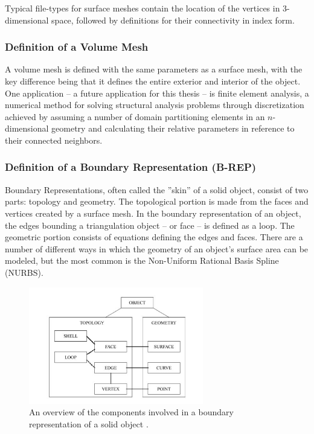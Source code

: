 \documentclass[12pt]{drexelthesis}
\let\Oldsubsubsection\subsubsection
\renewcommand{\subsubsection}{\FloatBarrier\Oldsubsubsection}
\begin{document}
Typical file-types for surface meshes contain the location of the vertices in 3-dimensional space, followed by definitions for their connectivity in index form.

\subsubsection{Definition of a Volume Mesh}
A volume mesh is defined with the same parameters as a surface mesh, with the key difference being that it defines the entire exterior and interior of the object.
One application -- a future application for this thesis -- is finite element analysis, a numerical method for solving structural analysis problems through discretization achieved by assuming a number of domain partitioning elements in an $n$-dimensional geometry and calculating their relative parameters in reference to their connected neighbors.

\subsubsection{Definition of a Boundary Representation (B-REP)}
Boundary Representations, often called the ''skin'' of a solid object, consist of two parts: topology and geometry. The topological portion is made from the faces and vertices created by a surface mesh. In the boundary representation of an object, the edges bounding a triangulation object -- or face -- is defined as a loop. The geometric portion consists of equations defining the edges and faces. There are a number of different ways in which the geometry of an object's surface area can be modeled, but the most common is the Non-Uniform Rational Basis Spline (NURBS).

\begin{figure}[!ht]
	\centering
		\includegraphics[width=3in]{cadTypes/brep.jpg}
	\caption[Components of a boundary representation.]{\centering An overview of the components involved in a boundary representation of a solid object \cite{Stroud2006}.}
\end{figure}
\end{document}
